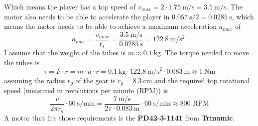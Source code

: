 \noindent Which means the player has a top speed of $v_{max}=2\cdot \qty[per-mode=symbol]{1.75}{\m\per\s}=\qty[per-mode=symbol]{3.5}{\m\per\s}$.
The motor also needs to be able to accelerate the player in $\qty[per-mode=symbol]{0.057}{\s}/2=\qty[per-mode=symbol]{0.0285}{\s}$, which means the motor needs to be able to achieve a maximum acceleration $a_{max}$ of
\begin{equation}
    \label{eq:acceleration}
    a_{max} = \frac{v_{max}}{t_s} = \frac{\qty[per-mode=symbol]{3.5}{\m\per\s}}{\qty[per-mode=symbol]{0.0285}{\s}} = \qty[per-mode=symbol]{122.8}{\m\per\s\squared}.
\end{equation}
I assume that the weight of the tubes is $m \approx \qty[per-mode=symbol]{0.1}{\kg}$.
The torque needed to move the tubes is
\begin{equation}
    \label{eq:torque}
    \tau = F \cdot r = m \cdot a \cdot r = \qty[per-mode=symbol]{0.1}{\kg} \cdot \qty[per-mode=symbol]{122.8}{\m\per\s\squared} \cdot \qty[per-mode=symbol]{0.083}{\m} \approx \qty[per-mode=symbol]{1}{\N\m}
\end{equation}
assuming the radius $r_g$ of the gear is $r_g=\qty[per-mode=symbol]{8.3}{\cm}$ and the required top rotational speed (measured in revolutions per minute (RPM)) is
\begin{equation}
    \label{eq:top_rpm}
    \frac{v}{2\pi r_g} \cdot \qty[per-mode=symbol]{60}{\s\per\minute} = \frac{\qty[per-mode=symbol]{7}{\m\per\s}}{2\pi \cdot \qty[per-mode=symbol]{0.083}{\m}} \cdot \qty[per-mode=symbol]{60}{\s\per\minute} \approx 800\text{ RPM}
\end{equation}
A motor that fits those requirements is the \textbf{PD42-3-1141\autocite{PD42-3-1141}} from \textbf{Trinamic}.

